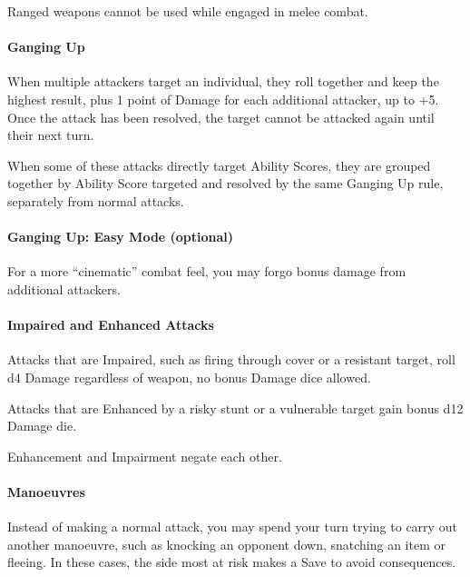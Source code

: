\documentclass[itdr]{subfiles}
\begin{document}
Ranged weapons cannot be used while engaged in melee combat.

\vfill

\paragraph{Ganging Up}
When multiple attackers target an individual, they roll together and keep the highest result, plus 1 point of Damage for each additional attacker, up to +5. Once the attack has been resolved, the target cannot be attacked again until their next turn.

When some of these attacks directly target Ability Scores, they are grouped together by Ability Score targeted and resolved by the same Ganging Up rule, separately from normal attacks.

\begin{dbox}
\paragraph{Ganging Up: Easy Mode (optional)}
For a more ``cinematic'' combat feel, you may forgo bonus damage from additional attackers.
\end{dbox}
\break


\paragraph{Impaired and Enhanced Attacks}
Attacks that are Impaired, such as firing through cover or a resistant target, roll d4 Damage regardless of weapon, no bonus Damage dice allowed.

Attacks that are Enhanced by a risky stunt or a vulnerable target gain bonus d12 Damage die.

Enhancement and Impairment negate each other.

\vfill
\paragraph{Manoeuvres}
Instead of making a normal attack, you may spend your turn trying to carry out another manoeuvre, such as knocking an opponent down, snatching an item or fleeing. In these cases, the side most at risk makes a Save to avoid consequences.
\end{document}
